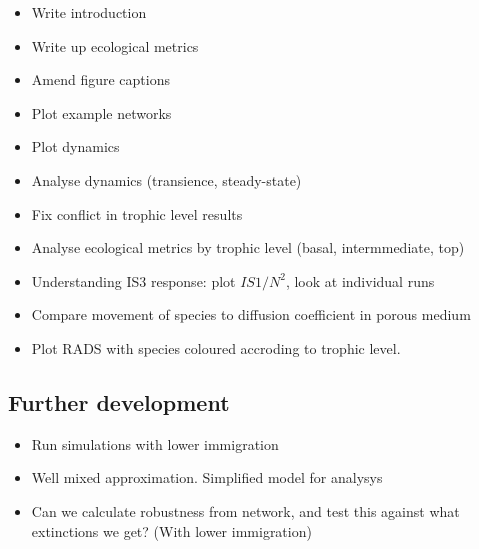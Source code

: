 \begin{itemize}
	\item Write introduction
	\item Write up ecological metrics
	\item Amend figure captions
	\item Plot example networks
	\item Plot dynamics
	\item Analyse dynamics (transience, steady-state)
	\item Fix conflict in trophic level results
	\item Analyse ecological metrics by trophic level (basal, intermmediate, top)
	\item Understanding IS3 response: plot $IS1/N^2$, look at individual runs
	\item Compare movement of species to diffusion coefficient in porous medium
	\item Plot RADS with species coloured accroding to trophic level.
\end{itemize}

\subsection{Further development}

\begin{itemize}
	\item Run simulations with lower immigration
	\item Well mixed approximation. Simplified model for analysys
	\item Can we calculate robustness from network, and test this against what extinctions we get? (With lower immigration)
\end{itemize}
